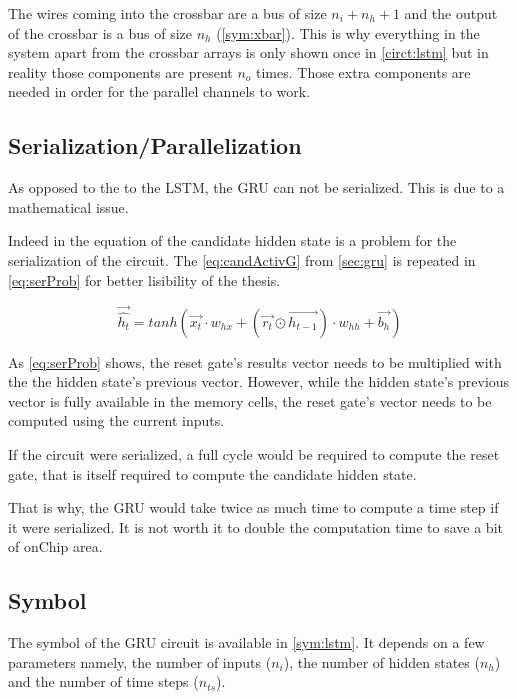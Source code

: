The wires coming into the crossbar are a bus of size $n_i+n_h+1$ and the output of the crossbar is a bus of size $n_h$ (\cref{sym:xbar}). This is why everything in the system apart from the crossbar arrays is only shown once in \cref{circt:lstm} but in reality those components are present $n_o$ times. Those extra components are needed in order for the parallel channels to work.

\subsection{Serialization/Parallelization}
\label{subsec:gruSerPar}

As opposed to the to the \ac{LSTM}, the \ac{GRU} can not be serialized. This is due to a mathematical issue.

Indeed in the equation of the candidate hidden state is a problem for the serialization of the circuit. The \cref{eq:candActivG} from \cref{sec:gru} is repeated in \cref{eq:serProb} for better lisibility of the thesis.

\begin{equation}\label{eq:serProb}
  \overrightarrow{\hat{h_t}}=tanh(\overrightarrow{x_t}\cdot w_{hx}+(\overrightarrow{r_t}\odot\overrightarrow{h_{t-1}}) \cdot w_{hh} + \overrightarrow{b_h})
\end{equation}

As \cref{eq:serProb} shows, the reset gate's results vector needs to be multiplied with the the hidden state's previous vector. However, while the hidden state's previous vector is fully available in the memory cells, the reset gate's vector needs to be computed using the current inputs.

If the circuit were serialized, a full cycle would be required to compute the reset gate, that is itself required to compute the candidate hidden state.

That is why, the \ac{GRU} would take twice as much time to compute a time step if it were serialized. It is not worth it to double the computation time to save a bit of onChip area.

\subsection{Symbol}

The symbol of the \ac{GRU} circuit is available in \cref{sym:lstm}. It depends on a few parameters namely, the number of inputs ($n_i$), the number of hidden states ($n_h$) and the number of time steps ($n_{ts}$).

